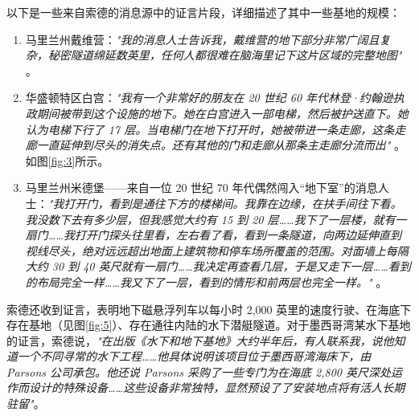 \documentclass[10pt,twocolumn,letterpaper]{article}
\begin{document}
以下是一些来自索德的消息源中的证言片段，详细描述了其中一些基地的规模：

\begin{flushleft}
\begin{enumerate}
    \item 马里兰州戴维营：\textit{"我的消息人士告诉我，戴维营的地下部分非常广阔且复杂，秘密隧道绵延数英里，任何人都很难在脑海里记下这片区域的完整地图"} \cite{22}。
    \item 华盛顿特区白宫：\textit{"我有一个非常好的朋友在 20 世纪 60 年代林登·约翰逊执政期间被带到这个设施的地下。她在白宫进入一部电梯，然后被护送直下。她认为电梯下行了 17 层。当电梯门在地下打开时，她被带进一条走廊，这条走廊一直延伸到尽头的消失点。还有其他的门和走廊从那条主走廊分流而出"} \cite{22}。如图\ref{fig:3}所示。
    \item 马里兰州米德堡——来自一位 20 世纪 70 年代偶然闯入“地下室”的消息人士：\textit{"我打开门，看到是通往下方的楼梯间。我靠在边缘，在扶手间往下看。我没数下去有多少层，但我感觉大约有 15 到 20 层……我下了一层楼，就有一扇门……我打开门探头往里看，左右看了看，看到一条隧道，向两边延伸直到视线尽头，绝对远远超出地面上建筑物和停车场所覆盖的范围。对面墙上每隔大约 30 到 40 英尺就有一扇门……我决定再查看几层，于是又走下一层……看到的布局完全一样……我又下了一层，看到的情形和前两层也完全一样。"} \cite{22}。
\end{enumerate}
\end{flushleft}

索德还收到证言，表明地下磁悬浮列车以每小时 2,000 英里的速度行驶、在海底下存在基地（见图\ref{fig:5}）、存在通往内陆的水下潜艇隧道。对于墨西哥湾某水下基地的证言，索德说，\textit{"在出版《水下和地下基地》大约半年后，有人联系我，说他知道一个不同寻常的水下工程……他具体说明该项目位于墨西哥湾海床下，由 Parsons 公司承包。他还说 Parsons 采购了一些专门为在海底 2,800 英尺深处运作而设计的特殊设备……这些设备非常独特，显然预设了了安装地点将有活人长期驻留"}\cite{22}。
\end{document}
